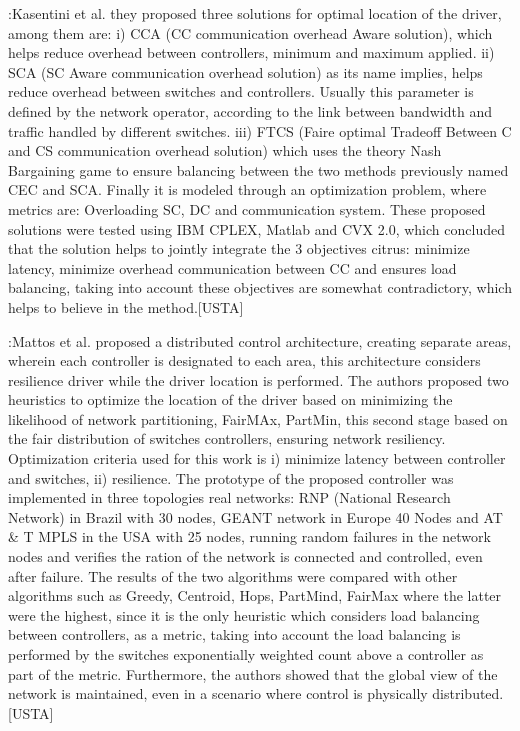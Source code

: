 \documentclass[a4paper,10pt]{article}
\begin{document}
\cite{KsBa16}:Kasentini et al. they proposed three solutions for optimal location of the driver, among them are: i) CCA (CC communication overhead Aware solution), which helps reduce overhead between controllers, minimum and maximum applied. ii) SCA (SC Aware communication overhead solution) as its name implies, helps reduce overhead between switches and controllers. Usually this parameter is defined by the network operator, according to the link between bandwidth and traffic handled by different switches. iii) FTCS (Faire optimal Tradeoff Between C and CS communication overhead solution) which uses the theory Nash Bargaining game to ensure balancing between the two methods previously named CEC and SCA. Finally it is modeled through an optimization problem, where metrics are: Overloading SC, DC and communication system. These proposed solutions were tested using IBM CPLEX, Matlab and CVX 2.0, which concluded that the solution helps to jointly integrate the 3 objectives citrus: minimize latency, minimize overhead communication between CC and ensures load balancing, taking into account these objectives are somewhat contradictory, which helps to believe in the method.[USTA]


\cite{MaDu16}:Mattos et al. proposed a distributed control architecture, creating separate areas, wherein each controller is designated to each area, this architecture considers resilience driver while the driver location is performed. The authors proposed two heuristics to optimize the location of the driver based on minimizing the likelihood of network partitioning, FairMAx, PartMin, this second stage based on the fair distribution of switches controllers, ensuring network resiliency. Optimization criteria used for this work is i) minimize latency between controller and switches, ii) resilience. The prototype of the proposed controller was implemented in three topologies real networks: RNP (National Research Network) in Brazil with 30 nodes, GEANT network in Europe 40 Nodes and AT & T MPLS in the USA with 25 nodes, running random failures in the network nodes and verifies the ration of the network is connected and controlled, even after failure. The results of the two algorithms were compared with other algorithms such as Greedy, Centroid, Hops, PartMind, FairMax where the latter were the highest, since it is the only heuristic which considers load balancing between controllers, as a metric, taking into account the load balancing is performed by the switches exponentially weighted count above a controller as part of the metric. Furthermore, the authors showed that the global view of the network is maintained, even in a scenario where control is physically distributed.[USTA]
\end{document}
